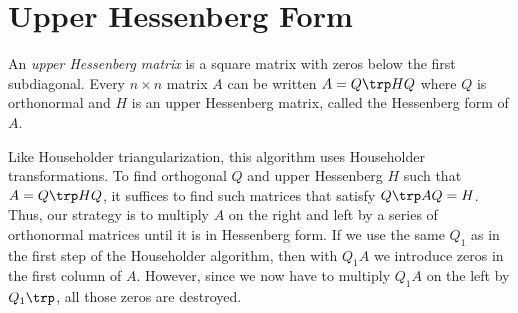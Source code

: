 \section*{Upper Hessenberg Form} %

An \emph{upper Hessenberg matrix} is a square matrix with zeros below the first subdiagonal.
Every  $n \times n$ matrix $A$ can be written $A = Q\trp HQ$ where $Q$ is orthonormal and $H$ is an upper Hessenberg matrix, called the Hessenberg form of $A$.


Like Householder triangularization, this algorithm uses Householder transformations.
To find orthogonal $Q$ and upper Hessenberg $H$ such that $A = Q\trp HQ$, it suffices to find such matrices that satisfy $Q\trp AQ=H$.
Thus, our strategy is to multiply $A$ on the right and left by a series of orthonormal matrices until it is in Hessenberg form.
If we use the same $Q_1$ as in the first step of the Householder algorithm, then with $Q_1 A$ we introduce zeros in the first column of $A$.
However, since we now have to multiply $Q_1 A$ on the left by $Q_1\trp$, all those zeros are destroyed.

